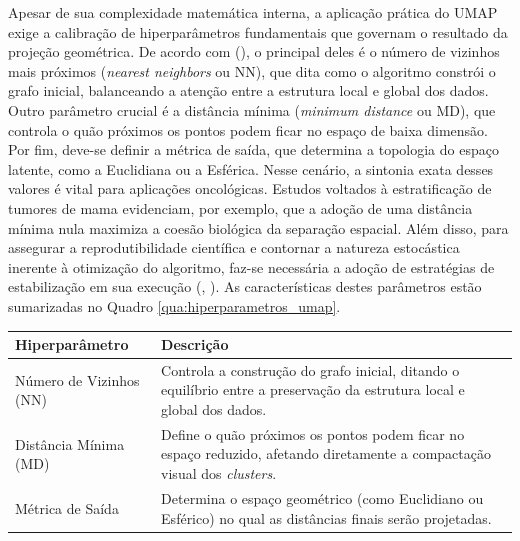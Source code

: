 \documentclass[
    12pt
    ,oneside
    ,a4paper
    ,chapter=TITLE
    ,section=TITLE
    ,sumario=abnt-6027-2012
    ,english,brazil]{abntex2} %
\begin{document}
Apesar de sua complexidade matemática interna, a aplicação prática do UMAP exige a calibração de hiperparâmetros fundamentais que governam o resultado da projeção geométrica. De acordo com  (\citeyear{Bollon2022}), o principal deles é o número de vizinhos mais próximos (\textit{nearest neighbors} ou NN), que dita como o algoritmo constrói o grafo inicial, balanceando a atenção entre a estrutura local e global dos dados. Outro parâmetro crucial é a distância mínima (\textit{minimum distance} ou MD), que controla o quão próximos os pontos podem ficar no espaço de baixa dimensão. Por fim, deve-se definir a métrica de saída, que determina a topologia do espaço latente, como a Euclidiana ou a Esférica. Nesse cenário, a sintonia exata desses valores é vital para aplicações oncológicas. Estudos voltados à estratificação de tumores de mama evidenciam, por exemplo, que a adoção de uma distância mínima nula maximiza a coesão biológica da separação espacial. Além disso, para assegurar a reprodutibilidade científica e contornar a natureza estocástica inerente à otimização do algoritmo, faz-se necessária a adoção de estratégias de estabilização em sua execução (, \citeyear{Bollon2022}). As características destes parâmetros estão sumarizadas no Quadro \ref{qua:hiperparametros_umap}.

\begin{quadro}[htpb]
\centering
\caption{PRINCIPAIS HIPERPARÂMETROS DO ALGORITMO UMAP}
\vspace{0.2cm}
\begin{tabular}{|l|p{10cm}|}
\hline
\textbf{Hiperparâmetro} & \textbf{Descrição} \\
\hline
Número de Vizinhos (NN) & Controla a construção do grafo inicial, ditando o equilíbrio entre a preservação da estrutura local e global dos dados. \\
\hline
Distância Mínima (MD) & Define o quão próximos os pontos podem ficar no espaço reduzido, afetando diretamente a compactação visual dos \textit{clusters}. \\
\hline
Métrica de Saída & Determina o espaço geométrico (como Euclidiano ou Esférico) no qual as distâncias finais serão projetadas. \\
\hline
\end{tabular}
\label{qua:hiperparametros_umap}
\vspace{0.2cm}
\end{quadro}
\end{document}
